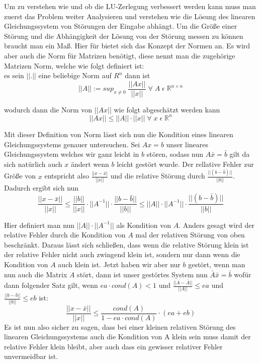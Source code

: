 \documentclass[course=erap]{aspdoc}
\begin{document}
Um zu verstehen wie und ob die LU-Zerlegung verbessert werden kann muss man 
zuerst das Problem weiter Analysieren und verstehen wie die Lösung des linearen 
Gleichungssystem von Störungen der Eingabe abhängt. 
Um die Größe einer Störung und die Abhängigkeit der Lösung von der Störung messen zu 
können braucht man ein Maß. Hier für bietet sich das Konzept der Normen an. Es wird aber 
auch die Norm für Matrizen benötigt, diese nennt man die zugehörige Matrizen Norm, 
welche wie folgt definiert ist: \\
es sein $||.||$ eine beliebige Norm auf $R^n$ dann ist  
  \begin{equation}
    \label{norm}
    ||A|| := sup_{x\neq 0}\;\frac{||Ax||}{||x||}\; \forall\; A \;\epsilon \;\mathbb{R}^{n \times n}
  \end{equation}

wodurch dann die Norm von $||Ax||$ wie folgt abgeschätzt werden kann
  \begin{equation}
    \label{norm}
    ||Ax|| \leq ||A|| \cdot ||x||\;  \forall\; x \;\epsilon \;\mathbb{R}^n 
  \end{equation}

Mit dieser Definition von Norm lässt sich nun die Kondition eines linearen 
Gleichungssystems genauer untersuchen. Sei $Ax=b$ unser lineares Gleichungssystem 
welches wir ganz leicht in $b$ stören, sodass nun $A \bar{x}=\bar{b}$ gilt da sich natürlich auch $x $
ändert wenn $b$ leicht gestört wurde. 
Der rellative Fehler zur Größe von $x$ entspricht also 
$\frac{||x-\bar{x}|}{||x||}$ und die relative Störung durch 
$\frac{||(b-\bar{b})||}{||b||}$. Dadurch ergibt sich nun 
  \begin{equation}
    \label{norm}
    \frac{||x- \bar{x}||}{||x||}   \leq    \frac{||b||} {||x||} \cdot ||A^{-1}|| \cdot \frac{||b-\bar{b}||}{||b||} \leq ||A|| \cdot ||A^{-1}|| \cdot \frac{||(b-\bar{b})||} {||b||}
  \end{equation}
 
Hier definiert man nun $||A|| \cdot ||A^{-1}||$ als Kondition von $A$. Anders gesagt wird 
der relative Fehler durch die Kondition von $A$ mal der relativen Störung 
von oben beschränkt. Daraus lässt sich schließen, dass wenn die relative Störung klein 
ist der relative Fehler nicht auch zwingend klein ist, sondern nur dann wenn die 
Kondition von $A$ auch klein ist.
Jetzt haben wir aber nur $b$ gestört, wenn man nun auch die Matrix $A$ stört, dann ist 
unser gestörtes System nun $\bar{A} \bar{x} = \bar{b}$ wofür dann folgender Satz gilt, wenn $ea \cdot cond(A) < 1$ 
und $\frac{||A - \bar{A}||} {||A||} \leq ea $	und 	$\frac{||b - \bar{b}||} {||b||} \leq eb $ ist:\\
  \begin{equation}
    \frac{||x-\bar{x}||} {||x||} \leq \frac{cond(A)} {1- ea \cdot cond(A)} \cdot (ea + eb)   
  \end{equation}
Es ist nun also sicher zu sagen, dass bei einer kleinen relativen Störung des linearen 
Gleichungssystems auch die Kondition von A klein sein muss damit der relative Fehler 
klein bleibt, aber auch dass ein gewisser relativer Fehler unvermeidbar ist.
\end{document}
